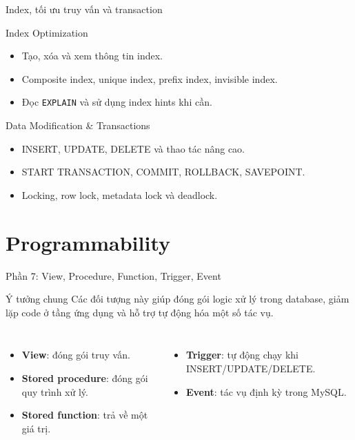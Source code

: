 \documentclass[aspectratio=169,11pt]{beamer}
\newcommand{\kw}[1]{\textcolor{dbblue}{\textbf{#1}}}
\begin{document}
\begin{frame}{Index, tối ưu truy vấn và transaction}
\begin{block}{Index Optimization}
\begin{itemize}
  \item Tạo, xóa và xem thông tin index.
  \item Composite index, unique index, prefix index, invisible index.
  \item Đọc \texttt{EXPLAIN} và sử dụng index hints khi cần.
\end{itemize}
\end{block}

\begin{block}{Data Modification \& Transactions}
\begin{itemize}
  \item INSERT, UPDATE, DELETE và thao tác nâng cao.
  \item START TRANSACTION, COMMIT, ROLLBACK, SAVEPOINT.
  \item Locking, row lock, metadata lock và deadlock.
\end{itemize}
\end{block}
\end{frame}

\section{Programmability}
\begin{frame}{Phần 7: View, Procedure, Function, Trigger, Event}
\begin{block}{Ý tưởng chung}
Các đối tượng này giúp đóng gói logic xử lý trong database, giảm lặp code ở tầng ứng dụng và hỗ trợ tự động hóa một số tác vụ.
\end{block}

\begin{columns}[T,onlytextwidth]
\begin{itemize}
  \item \kw{View}: đóng gói truy vấn.
  \item \kw{Stored procedure}: đóng gói quy trình xử lý.
  \item \kw{Stored function}: trả về một giá trị.
\end{itemize}
\begin{itemize}
  \item \kw{Trigger}: tự động chạy khi INSERT/UPDATE/DELETE.
  \item \kw{Event}: tác vụ định kỳ trong MySQL.
\end{itemize}
\end{columns}
\end{frame}
\end{document}
